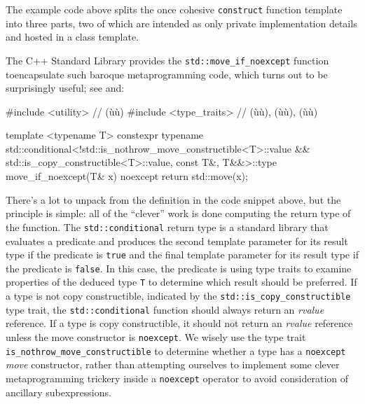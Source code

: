 \noindent The example code above splits the once cohesive \lstinline!construct!
function template into three parts, two of which are intended as only
private implementation details and hosted in a class template.

The C++ Standard Library provides the \lstinline!std::move_if_noexcept!
function to\linebreak[4] encapsulate such baroque metaprogramming code, which turns
out to be surprisingly useful; see  and\linebreak[4]
:

\begin{emcppshiddenlisting}[emcppsbatch=e21]
#include <utility>  // (ù{}ù)
#include <type_traits>  // (ù{}ù), (ù{}ù), (ù{}ù)
\end{emcppshiddenlisting}
\begin{emcppslisting}[emcppsbatch=e21]
template <typename T>
constexpr
typename std::conditional<!std::is_nothrow_move_constructible<T>::value
                          && std::is_copy_constructible<T>::value,
                          const T&,
                          T&&>::type
move_if_noexcept(T& x) noexcept
{
    return std::move(x);
}
\end{emcppslisting}
    

\noindent There's a lot to unpack from the definition in the code snippet above,
but the principle is simple: all of the ``clever'' work is done
computing the return type of the function. The \lstinline!std::conditional!
return type is a standard library  that evaluates a
predicate and produces the second template parameter for its result type
if the predicate is \lstinline!true! and the final template parameter for
its result type if the predicate is \lstinline!false!. In this case, the
predicate is using type traits to examine properties of the deduced type
\lstinline!T! to determine which result should be preferred. If a type is
not copy constructible, indicated by the
\lstinline!std::is_copy_constructible! type trait, the
\lstinline!std::conditional! function should always return an \emph{rvalue}
reference. If a type is copy constructible, it should not return an
\emph{rvalue} reference unless the move constructor is
\lstinline!noexcept!. We wisely use the type trait
\lstinline!is_nothrow_move_constructible! to determine whether a type
has a \lstinline!noexcept! \emph{move} constructor, rather than attempting
ourselves to implement some clever metaprogramming trickery inside a
\lstinline!noexcept! operator to avoid consideration of ancillary
subexpressions.

